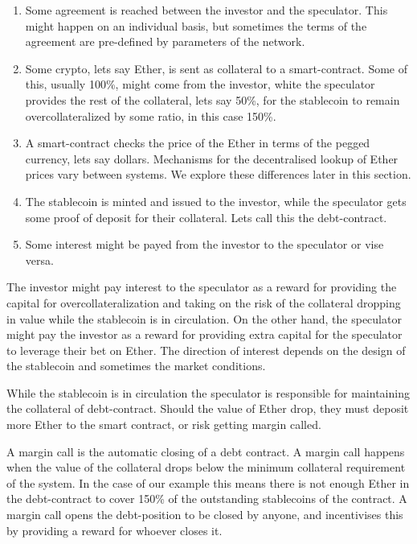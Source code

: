\documentclass[english,]{IEEEtran}
\providecommand{\tightlist}{%
  \setlength{\itemsep}{0pt}\setlength{\parskip}{0pt}}
\begin{document}
\begin{enumerate}
\def\labelenumi{\arabic{enumi}.}
\setcounter{enumi}{-1}
\tightlist
\item
  Some agreement is reached between the investor and the speculator.
  This might happen on an individual basis, but sometimes the terms of
  the agreement are pre-defined by parameters of the network.
\item
  Some crypto, lets say Ether, is sent as collateral to a
  smart-contract. Some of this, usually 100\%, might come from the
  investor, white the speculator provides the rest of the collateral,
  lets say 50\%, for the stablecoin to remain overcollateralized by some
  ratio, in this case 150\%.
\item
  A smart-contract checks the price of the Ether in terms of the pegged
  currency, lets say dollars. Mechanisms for the decentralised lookup of
  Ether prices vary between systems. We explore these differences later
  in this section.
\item
  The stablecoin is minted and issued to the investor, while the
  speculator gets some proof of deposit for their collateral. Lets call
  this the debt-contract.
\item
  Some interest might be payed from the investor to the speculator or
  vise versa.
\end{enumerate}

The investor might pay interest to the speculator as a reward for
providing the capital for overcollateralization and taking on the risk
of the collateral dropping in value while the stablecoin is in
circulation. On the other hand, the speculator might pay the investor as
a reward for providing extra capital for the speculator to leverage
their bet on Ether. The direction of interest depends on the design of
the stablecoin and sometimes the market conditions.

While the stablecoin is in circulation the speculator is responsible for
maintaining the collateral of debt-contract. Should the value of Ether
drop, they must deposit more Ether to the smart contract, or risk
getting margin called.

A margin call is the automatic closing of a debt contract. A margin call
happens when the value of the collateral drops below the minimum
collateral requirement of the system. In the case of our example this
means there is not enough Ether in the debt-contract to cover 150\% of
the outstanding stablecoins of the contract. A margin call opens the
debt-position to be closed by anyone, and incentivises this by providing
a reward for whoever closes it.
\end{document}
